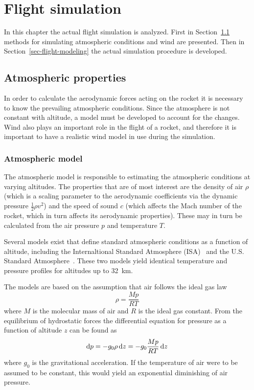 

\chapter{Flight simulation}
\label{chap-simulation}

In this chapter the actual flight simulation is analyzed.  First in
Section~\ref{sec-atmospheric-properties} methods for simulating
atmospheric conditions and wind are presented.  Then in
Section~\ref{sec-flight-modeling} the actual simulation procedure is
developed.



\section{Atmospheric properties}
\label{sec-atmospheric-properties}

In order to calculate the aerodynamic forces acting on the rocket it
is necessary to know the prevailing atmospheric conditions.  Since the
atmosphere is not constant with altitude, a model must be developed to
account for the changes.  Wind also plays an important role in the
flight of a rocket, and therefore it is important to have a realistic
wind model in use during the simulation.


\subsection{Atmospheric model}

The atmospheric model is responsible to estimating the atmospheric
conditions at varying altitudes.  The properties that are of most
interest are the density of air $\rho$ (which is a scaling parameter
to the aerodynamic coefficients via the dynamic pressure
$\frac{1}{2}\rho v^2$) and the speed of sound $c$ (which affects the
Mach number of the rocket, which in turn affects its aerodynamic
properties).  These may in turn be calculated from the air pressure
$p$ and temperature $T$.

Several models exist that define standard atmospheric conditions as a
function of altitude, including the Internaltional Standard
Atmosphere (ISA)~\cite{international-standard-atmosphere} and the
U.S. Standard Atmosphere~\cite{US-standard-atmosphere}.  These two
models yield identical temperature and pressure profiles for altitudes
up to 32~km.

The models are based on the assumption that air follows the ideal gas
law
%
\begin{equation}
\rho = \frac{Mp}{RT}
\end{equation}
%
where $M$ is the molecular mass of air and $R$ is the ideal gas
constant.  From the equilibrium of hydrostatic forces the differential
equation for pressure as a function of altitude $z$ can be found as
%
\begin{equation}
\dif p = -g_0 \rho \dif z = -g_0 \frac{Mp}{RT} \dif z
\label{eq-pressure-altitude}
\end{equation}
%
where $g_0$ is the gravitational acceleration.  If the temperature of
air were to be assumed to be constant, this would yield an exponential
diminishing of air pressure.

